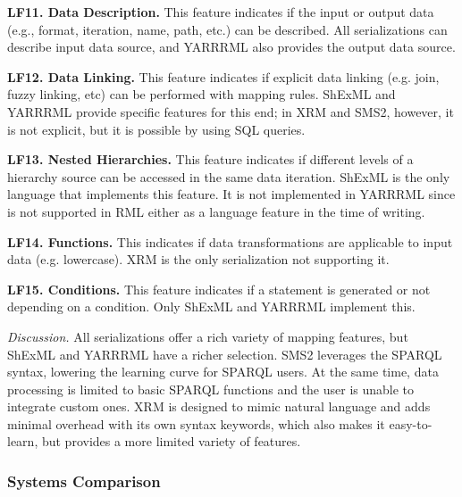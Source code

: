 \textbf{LF11. Data Description.}
This feature indicates if the input or output data (e.g., format, iteration, name, path, etc.) can be described. All serializations can describe input data source, and YARRRML also provides the output data source.

\textbf{LF12. Data Linking.}
This feature indicates if explicit data linking (e.g. join, fuzzy linking, etc) can be performed with mapping rules. ShExML and YARRRML provide specific features for this end; in XRM and SMS2, however, it is not explicit, but it is possible by using SQL queries. 

\textbf{LF13. Nested Hierarchies.}
This feature indicates if different levels of a hierarchy source can be accessed in the same data iteration. ShExML is the only language that implements this feature. It is not implemented in YARRRML since is not supported in RML either as a language feature in the time of writing. 

\textbf{LF14. Functions.}
This indicates if data transformations are applicable to input data (e.g. lowercase). XRM is the only serialization not supporting it. 

\textbf{LF15. Conditions.}
This feature indicates if a statement is generated or not depending on a condition. Only ShExML and YARRRML implement this.

\textit{Discussion.} 
All serializations offer a rich variety of mapping features, but ShExML and YARRRML have a richer selection. SMS2 leverages the SPARQL syntax, lowering the learning curve for SPARQL users. At the same time, data processing is limited to basic SPARQL functions and the user is unable to integrate custom ones. 
XRM is designed to mimic natural language and adds minimal overhead with its own syntax keywords, which also makes it easy-to-learn, but provides a more limited variety of features.


\subsubsection{Systems Comparison} 




